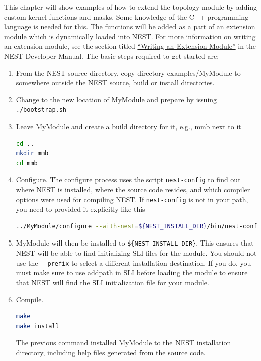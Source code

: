 \documentclass[a4paper,12pt]{report}
\begin{document}
This chapter will show examples of how to extend the topology module by
adding custom kernel functions and masks. Some knowledge of the C++
programming language is needed for this. The functions will be added as a
part of an extension module which is dynamically loaded into NEST. For more
information on writing an extension module, see the section titled
\href{http://nest.github.io/nest-simulator/extension_modules}{``Writing an Extension Module''}
in the NEST Developer Manual. The basic steps required to get started are:
\begin{enumerate}
\item From the NEST source directory, copy directory examples/MyModule to
  somewhere outside the NEST source, build or install directories.
\item Change to the new location of MyModule and prepare by issuing
  \lstinline!./bootstrap.sh!
\item Leave MyModule and create a build directory for it, e.g., mmb next to
  it
\begin{lstlisting}[language=bash]
cd ..
mkdir mmb
cd mmb
\end{lstlisting}
\item Configure. The configure process uses the script \lstinline!nest-config!
  to find out where NEST is installed, where the source code resides, and
  which compiler options were used for compiling NEST. If
  \lstinline!nest-config! is not in your path, you need to provided it
  explicitly like this
\begin{lstlisting}[language=bash]
../MyModule/configure --with-nest=${NEST_INSTALL_DIR}/bin/nest-config
\end{lstlisting}
\item MyModule will then be installed to \lstinline!${NEST_INSTALL_DIR}!. This
  ensures that NEST will be able to find initializing SLI files for the
  module.  You should not use the \lstinline!--prefix! to select a different
  installation destination. If you do, you must make sure to use addpath in
  SLI before loading the module to ensure that NEST will find the SLI
  initialization file for your module.
\item Compile.
\begin{lstlisting}[language=bash]
make
make install
\end{lstlisting}
The previous command installed MyModule to the NEST installation directory, including help files generated from the source code. 
\end{enumerate}
\end{document}
